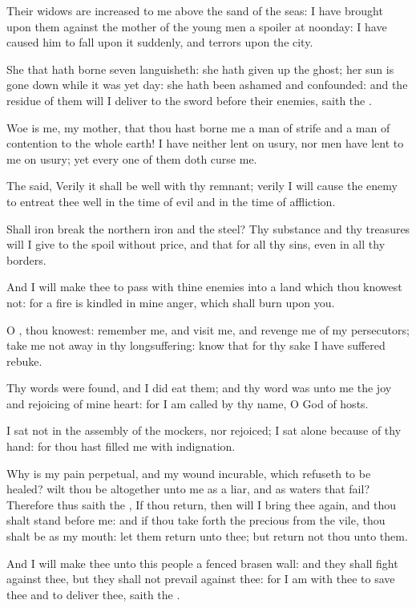 \verse Their widows are increased to me above the sand of the seas: I have brought upon them against the mother of the young men a spoiler at noonday: I have caused him to fall upon it suddenly, and terrors upon the city.

\verse She that hath borne seven languisheth: she hath given up the ghost; her sun is gone down while it was yet day: she hath been ashamed and confounded: and the residue of them will I deliver to the sword before their enemies, saith the \LORD.

\verse Woe is me, my mother, that thou hast borne me a man of strife and a man of contention to the whole earth! I have neither lent on usury, nor men have lent to me on usury; yet every one of them doth curse me.

\verse The \LORD said, Verily it shall be well with thy remnant; verily I will cause the enemy to entreat thee well in the time of evil and in the time of affliction.

\verse Shall iron break the northern iron and the steel?  \verse Thy substance and thy treasures will I give to the spoil without price, and that for all thy sins, even in all thy borders.

\verse And I will make thee to pass with thine enemies into a land which thou knowest not: for a fire is kindled in mine anger, which shall burn upon you.

\verse O \LORD, thou knowest: remember me, and visit me, and revenge me of my persecutors; take me not away in thy longsuffering: know that for thy sake I have suffered rebuke.

\verse Thy words were found, and I did eat them; and thy word was unto me the joy and rejoicing of mine heart: for I am called by thy name, O \LORD God of hosts.

\verse I sat not in the assembly of the mockers, nor rejoiced; I sat alone because of thy hand: for thou hast filled me with indignation.

\verse Why is my pain perpetual, and my wound incurable, which refuseth to be healed? wilt thou be altogether unto me as a liar, and as waters that fail?  \verse Therefore thus saith the \LORD, If thou return, then will I bring thee again, and thou shalt stand before me: and if thou take forth the precious from the vile, thou shalt be as my mouth: let them return unto thee; but return not thou unto them.

\verse And I will make thee unto this people a fenced brasen wall: and they shall fight against thee, but they shall not prevail against thee: for I am with thee to save thee and to deliver thee, saith the \LORD.

